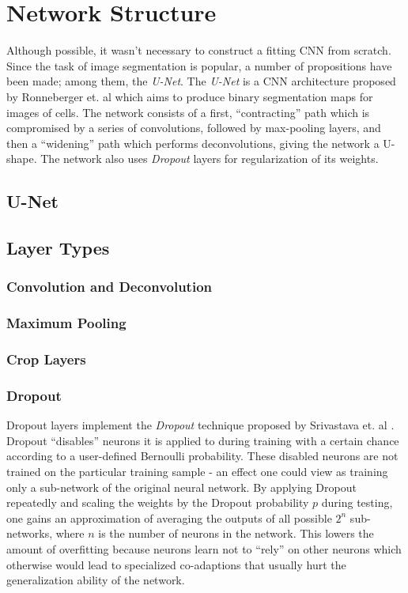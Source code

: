 \chapter {Network Structure}
Although possible, it wasn't necessary to construct a fitting CNN from scratch. Since the task of image segmentation is popular, a number of propositions have been made; among them, the \textit{U-Net}. The \textit{U-Net} is a CNN architecture proposed by Ronneberger et. al\cite{unet} which aims to produce binary segmentation maps for images of cells. The network consists of a first, ``contracting'' path which is compromised by a series of convolutions, followed by max-pooling layers, and then a ``widening'' path which performs deconvolutions, giving the network a U-shape. The network also uses \textit{Dropout} layers\cite{dropout} for regularization of its weights.

	\section {U-Net}

	\section {Layer Types}
	
		\subsection{Convolution and Deconvolution}
		\subsection{Maximum Pooling}
		\subsection {Crop Layers}

		\subsection {Dropout}
Dropout layers implement the \textit{Dropout} technique proposed by Srivastava et. al \cite{dropout}. Dropout ``disables'' neurons it is applied to during training with a certain chance according to a user-defined Bernoulli probability. These disabled neurons are not trained on the particular training sample - an effect one could view as training only a sub-network of the original neural network. By applying Dropout repeatedly and scaling the weights by the Dropout probability $p$ during testing, one gains an approximation of averaging the outputs of all possible $2^n$ sub-networks, where $n$ is the number of neurons in the network. This lowers the amount of overfitting because neurons learn not to ``rely'' on other neurons which otherwise would lead to specialized co-adaptions that usually hurt the generalization ability of the network.

